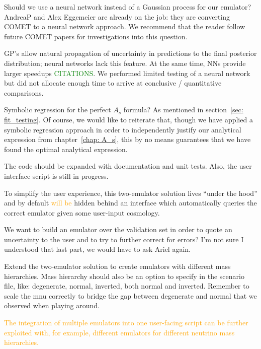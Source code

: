 
Should we use a neural network instead of a Gaussian process for our emulator? 
AndreaP and Alex Eggemeier are already on the job: they are converting COMET 
to a neural network approach. We recommend that the reader follow future COMET 
papers for investigations into this question.

GP's allow natural propagation of
uncertainty in predictions to the final posterior distribution; neural
networks lack this feature. At the same time, NNs provide larger speedups 
\textcolor{green}{CITATIONS}. We performed limited testing of a neural network
but did not allocate enough time to arrive at conclusive / quantitative
comparisons.

Symbolic regression for the perfect $A_s$ formula?
As mentioned in section~\ref{sec: fit_testing}.
Of course, we would 
like to reiterate that, though we have applied a symbolic regression approach 
in order to independently justify our analytical expression from
chapter~\ref{chap: A_s}, this by no means guarantees that we have found the 
optimal analytical expression.


The code should be expanded with documentation and unit tests. Also, the
user interface script is still in progress.

To simplify the user experience, this two-emulator solution lives ``under the
hood'' and by default \textcolor{orange}{will be} hidden behind an interface
which automatically queries the correct emulator given some user-input
cosmology.

We want to build an emulator over the validation set in order to quote an 
uncertainty to the user and to try to further correct for errors? I'm not sure 
I understood that last part, we would have to ask Ariel again.

Extend the two-emulator solution to create emulators with different mass
hierarchies. Mass hierarchy should also be an option to specify in the
scenario file, like: degenerate, normal, inverted, both normal and inverted. 
Remember to scale the mnu correctly to bridge the gap between degenerate and
normal that we observed when playing around.

\textcolor{orange}{The integration of 
multiple emulators into one user-facing script can be further exploited with, 
for example, different emulators for different neutrino mass hierarchies.}

